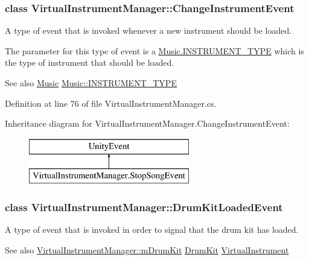\subsubsection{class Virtual\+Instrument\+Manager\+:\+:Change\+Instrument\+Event}
A type of event that is invoked whenever a new instrument should be loaded. 

The parameter for this type of event is a \hyperlink{group___music_enums_gabfce60192305965558a36e368ebd67c3}{Music.\+I\+N\+S\+T\+R\+U\+M\+E\+N\+T\+\_\+\+T\+Y\+PE} which is the type of instrument that should be loaded.

\begin{DoxySeeAlso}{See also}
\hyperlink{class_music}{Music} \hyperlink{group___music_enums_gabfce60192305965558a36e368ebd67c3}{Music\+::\+I\+N\+S\+T\+R\+U\+M\+E\+N\+T\+\_\+\+T\+Y\+PE} 
\end{DoxySeeAlso}


Definition at line 76 of file Virtual\+Instrument\+Manager.\+cs.

Inheritance diagram for Virtual\+Instrument\+Manager.\+Change\+Instrument\+Event\+:\begin{figure}[H]
\begin{center}
\leavevmode
\includegraphics[height=2.000000cm]{group___v_i_m_event_types}
\end{center}
\end{figure}
\label{class_virtual_instrument_manager_1_1_drum_kit_loaded_event}
\subsubsection{class Virtual\+Instrument\+Manager\+:\+:Drum\+Kit\+Loaded\+Event}
A type of event that is invoked in order to signal that the drum kit has loaded. 

\begin{DoxySeeAlso}{See also}
\hyperlink{group___v_i_m_priv_ga0bc7c9f776b0d2dae0ccb1f1ee5f2143}{Virtual\+Instrument\+Manager\+::m\+Drum\+Kit} \hyperlink{class_drum_kit}{Drum\+Kit} \hyperlink{class_virtual_instrument}{Virtual\+Instrument} 
\end{DoxySeeAlso}


